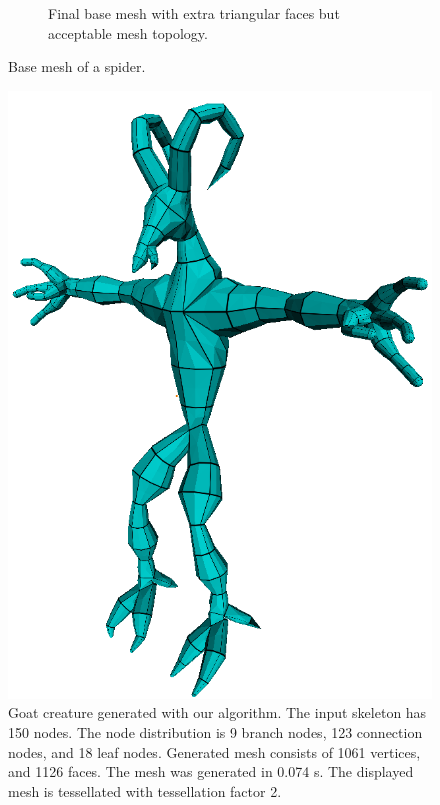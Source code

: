 \begin{figure}
\begin{subfigure}[b]{0.4\textwidth}
                \caption{Final base mesh with extra triangular faces but acceptable mesh topology.}
                \label{fig:pavuk_mesh_2}
        \end{subfigure}
        \caption[Base mesh of a spider]{Base mesh of a spider.}\label{fig:pavuk}
\end{figure}

\begin{figure}
    \centering
    \includegraphics[width=\textwidth]{images/goat_1.png}
    \caption[Generated goat creature]{Goat creature generated with our algorithm. The input skeleton has 150 nodes. The node distribution is 9 branch nodes, 123 connection nodes, and 18 leaf nodes. Generated mesh consists of 1061 vertices, and 1126 faces. The mesh was generated in 0.074 s. The displayed mesh is tessellated with tessellation factor 2.}
    \label{fig:result_goat}
\end{figure}

